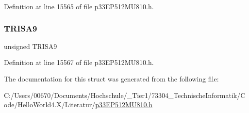 Definition at line 15565 of file p33\+E\+P512\+M\+U810.\+h.

\mbox{\label{structtag_t_r_i_s_a_b_i_t_s_ae739ca5b12324ecd748bfdffcec6cc65}} 
\subsubsection{\texorpdfstring{T\+R\+I\+S\+A9}{TRISA9}}
{\footnotesize\ttfamily unsigned T\+R\+I\+S\+A9}



Definition at line 15567 of file p33\+E\+P512\+M\+U810.\+h.



The documentation for this struct was generated from the following file\+:\begin{DoxyCompactItemize}
\item 
C\+:/\+Users/00670/\+Documents/\+Hochschule/\+\_\+\+Tier1/73304\+\_\+\+Technische\+Informatik/\+Code/\+Hello\+World4.\+X/\+Literatur/\hyperlink{p33_e_p512_m_u810_8h}{p33\+E\+P512\+M\+U810.\+h}\end{DoxyCompactItemize}
